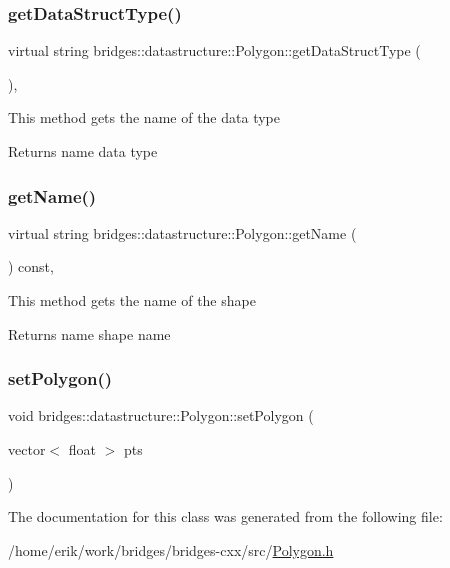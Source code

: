 \subsubsection{\texorpdfstring{get\+Data\+Struct\+Type()}{getDataStructType()}}
{\footnotesize\ttfamily virtual string bridges\+::datastructure\+::\+Polygon\+::get\+Data\+Struct\+Type (\begin{DoxyParamCaption}{ }\end{DoxyParamCaption})\hspace{0.3cm}{\ttfamily [inline]}, {\ttfamily [virtual]}}

This method gets the name of the data type

\begin{DoxyReturn}{Returns}
name data type 
\end{DoxyReturn}
\mbox{\label{classbridges_1_1datastructure_1_1_polygon_a9e11131b2a1f3b6044913577f51546c3}} 
\subsubsection{\texorpdfstring{get\+Name()}{getName()}}
{\footnotesize\ttfamily virtual string bridges\+::datastructure\+::\+Polygon\+::get\+Name (\begin{DoxyParamCaption}{ }\end{DoxyParamCaption}) const\hspace{0.3cm}{\ttfamily [inline]}, {\ttfamily [virtual]}}

This method gets the name of the shape

\begin{DoxyReturn}{Returns}
name shape name 
\end{DoxyReturn}
\mbox{\label{classbridges_1_1datastructure_1_1_polygon_a058a8ec2340f15f45dab27b18978055c}} 
\subsubsection{\texorpdfstring{set\+Polygon()}{setPolygon()}}
{\footnotesize\ttfamily void bridges\+::datastructure\+::\+Polygon\+::set\+Polygon (\begin{DoxyParamCaption}\item[{vector$<$ float $>$}]{pts }\end{DoxyParamCaption})\hspace{0.3cm}{\ttfamily [inline]}}



The documentation for this class was generated from the following file\+:\begin{DoxyCompactItemize}
\item 
/home/erik/work/bridges/bridges-\/cxx/src/\hyperlink{_polygon_8h}{Polygon.\+h}\end{DoxyCompactItemize}
